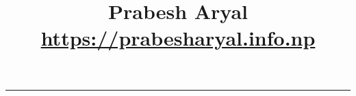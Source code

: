 \documentclass[a4paper,10pt]{article}
\begin{document}
\title{\LARGE\textbf{Prabesh Aryal}\\ \href{https://prabesharyal.info.np}{\footnotesize https://prabesharyal.info.np}}
\date{}
\maketitle
\thispagestyle{empty} %

\vspace{-\baselineskip}
\vspace{-\baselineskip}
\vspace{-\baselineskip}
\vspace{-\baselineskip}
\begin{center}
    \textcolor{techblue}{\rule{1\linewidth}{2pt}}
\end{center}
\vspace{\baselineskip}
\end{document}
